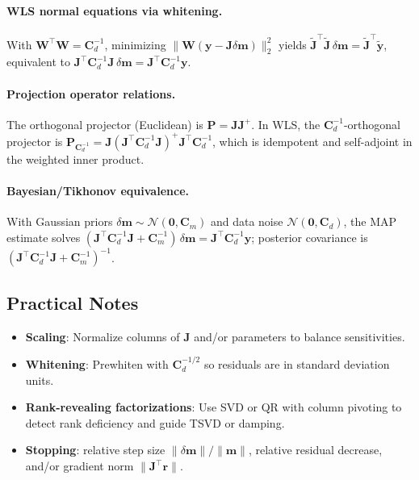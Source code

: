 \paragraph{WLS normal equations via whitening.} With $\mathbf{W}^\top\mathbf{W}=\mathbf{C}_d^{-1}$, minimizing $\|\mathbf{W}(\mathbf{y}-\mathbf{J}\delta\mathbf{m})\|_2^2$ yields $\tilde{\mathbf{J}}^\top\tilde{\mathbf{J}}\,\delta\mathbf{m}=\tilde{\mathbf{J}}^\top \tilde{\mathbf{y}}$, equivalent to $\mathbf{J}^\top \mathbf{C}_d^{-1} \mathbf{J}\,\delta\mathbf{m}=\mathbf{J}^\top \mathbf{C}_d^{-1} \mathbf{y}$.

\paragraph{Projection operator relations.} The orthogonal projector (Euclidean) is $\mathbf{P}=\mathbf{J}\mathbf{J}^+$. In WLS, the $\mathbf{C}_d^{-1}$-orthogonal projector is $\mathbf{P}_{\mathbf{C}_d^{-1}}=\mathbf{J} (\mathbf{J}^\top \mathbf{C}_d^{-1} \mathbf{J})^{+} \mathbf{J}^\top \mathbf{C}_d^{-1}$, which is idempotent and self-adjoint in the weighted inner product.

\paragraph{Bayesian/Tikhonov equivalence.} With Gaussian priors $\delta\mathbf{m}\sim\mathcal{N}(\mathbf{0},\mathbf{C}_m)$ and data noise $\mathcal{N}(\mathbf{0},\mathbf{C}_d)$, the MAP estimate solves $(\mathbf{J}^\top \mathbf{C}_d^{-1}\mathbf{J}+\mathbf{C}_m^{-1})\,\delta\mathbf{m}=\mathbf{J}^\top \mathbf{C}_d^{-1}\mathbf{y}$; posterior covariance is $(\mathbf{J}^\top \mathbf{C}_d^{-1}\mathbf{J}+\mathbf{C}_m^{-1})^{-1}$.

\subsection{Practical Notes}
\begin{itemize}
  \item \textbf{Scaling}: Normalize columns of $\mathbf{J}$ and/or parameters to balance sensitivities.
  \item \textbf{Whitening}: Prewhiten with $\mathbf{C}_d^{-1/2}$ so residuals are in standard deviation units.
  \item \textbf{Rank-revealing factorizations}: Use SVD or QR with column pivoting to detect rank deficiency and guide TSVD or damping.
  \item \textbf{Stopping}: relative step size $\|\delta\mathbf{m}\|/\|\mathbf{m}\|$, relative residual decrease, and/or gradient norm $\|\mathbf{J}^\top \mathbf{r}\|$.
\end{itemize}

